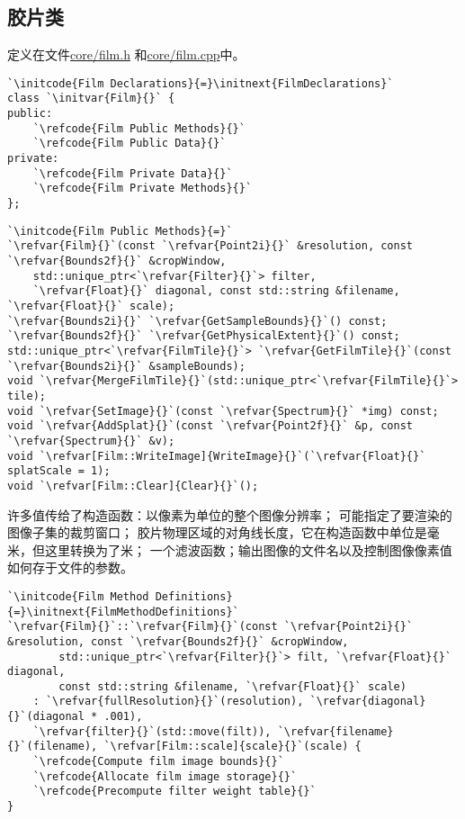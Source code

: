\subsection{胶片类}\label{sub:胶片类}
定义在文件\href{https://github.com/mmp/pbrt-v3/blob/master/src/core/film.h}{\ttfamily core/film.h}
和\href{https://github.com/mmp/pbrt-v3/blob/master/src/core/film.cpp}{\ttfamily core/film.cpp}中。
\begin{lstlisting}
`\initcode{Film Declarations}{=}\initnext{FilmDeclarations}`
class `\initvar{Film}{}` {
public:
    `\refcode{Film Public Methods}{}`
    `\refcode{Film Public Data}{}`
private:
    `\refcode{Film Private Data}{}`
    `\refcode{Film Private Methods}{}`
};
\end{lstlisting}
\begin{lstlisting}
`\initcode{Film Public Methods}{=}`
`\refvar{Film}{}`(const `\refvar{Point2i}{}` &resolution, const `\refvar{Bounds2f}{}` &cropWindow,
    std::unique_ptr<`\refvar{Filter}{}`> filter,
    `\refvar{Float}{}` diagonal, const std::string &filename, `\refvar{Float}{}` scale);
`\refvar{Bounds2i}{}` `\refvar{GetSampleBounds}{}`() const;
`\refvar{Bounds2f}{}` `\refvar{GetPhysicalExtent}{}`() const;
std::unique_ptr<`\refvar{FilmTile}{}`> `\refvar{GetFilmTile}{}`(const `\refvar{Bounds2i}{}` &sampleBounds);
void `\refvar{MergeFilmTile}{}`(std::unique_ptr<`\refvar{FilmTile}{}`> tile);
void `\refvar{SetImage}{}`(const `\refvar{Spectrum}{}` *img) const;
void `\refvar{AddSplat}{}`(const `\refvar{Point2f}{}` &p, const `\refvar{Spectrum}{}` &v);
void `\refvar[Film::WriteImage]{WriteImage}{}`(`\refvar{Float}{}` splatScale = 1);
void `\refvar[Film::Clear]{Clear}{}`();
\end{lstlisting}

许多值传给了构造函数：以像素为单位的整个图像分辨率；
可能指定了要渲染的图像子集的裁剪窗口；
胶片物理区域的对角线长度，它在构造函数中单位是毫米，但这里转换为了米；
一个滤波函数；输出图像的文件名以及控制图像像素值如何存于文件的参数。
\begin{lstlisting}
`\initcode{Film Method Definitions}{=}\initnext{FilmMethodDefinitions}`
`\refvar{Film}{}`::`\refvar{Film}{}`(const `\refvar{Point2i}{}` &resolution, const `\refvar{Bounds2f}{}` &cropWindow,
        std::unique_ptr<`\refvar{Filter}{}`> filt, `\refvar{Float}{}` diagonal,
        const std::string &filename, `\refvar{Float}{}` scale)
    : `\refvar{fullResolution}{}`(resolution), `\refvar{diagonal}{}`(diagonal * .001),
    `\refvar{filter}{}`(std::move(filt)), `\refvar{filename}{}`(filename), `\refvar[Film::scale]{scale}{}`(scale) {
    `\refcode{Compute film image bounds}{}`
    `\refcode{Allocate film image storage}{}`
    `\refcode{Precompute filter weight table}{}`
}
\end{lstlisting}

